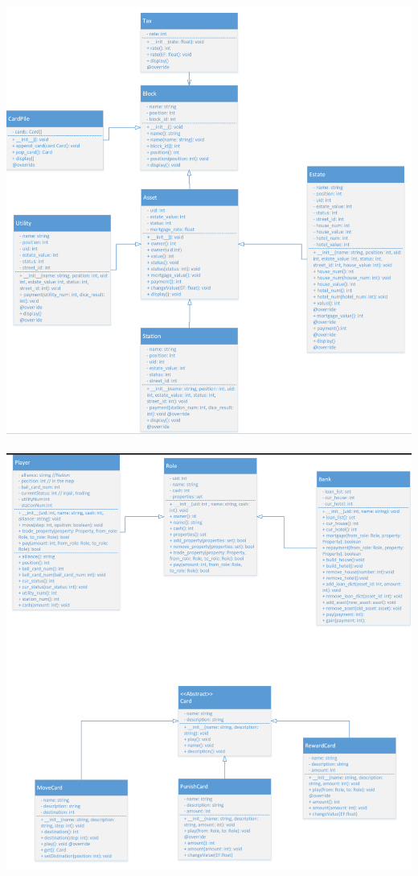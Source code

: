 \documentclass[a4paper,12pt]{article}
\begin{document}
\includegraphics[scale=0.9]{image/Block.png}
\\
\\
\includegraphics[scale=0.9]{image/roleandcard.png}
\end{document}
